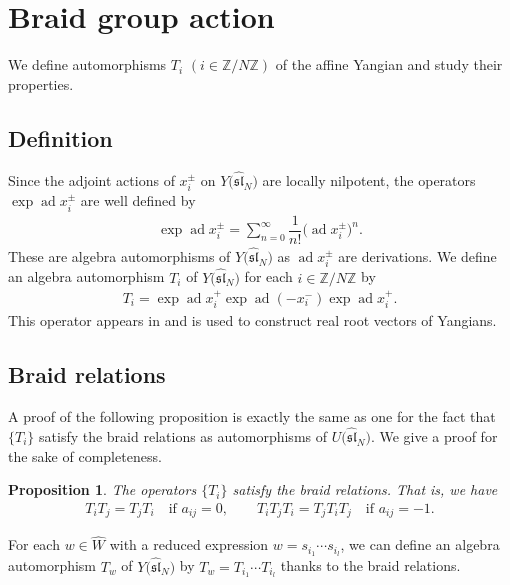 \documentclass[10pt,a4paper]{amsart}
\newtheorem{prop}[thm]{Proposition}
\theoremstyle{definition}
\numberwithin{equation}{section}
\DeclareMathOperator{\ad}{ad}
\newcommand{\bbZ}{\mathbb{Z}}
\newcommand{\affY}{Y\big(\affsl\big)}
\newcommand{\affsl}{\hat{\mathfrak{sl}}_N}
\begin{document}
\section{Braid group action}\label{section3}

We define automorphisms $T_i$ $(i \in \bbZ/N\bbZ)$ of the affine Yangian and study their properties.

\subsection{Definition}

Since the adjoint actions of $x_i^{\pm}$ on $\affY$ are locally nilpotent, the operators $\exp\ad x_i^{\pm}$ are well defined by
\begin{gather*}
\exp\ad x_i^{\pm} = \sum_{n=0}^{\infty} \dfrac{1}{n!} \big(\ad x_i^{\pm}\big)^n.
\end{gather*}
These are algebra automorphisms of $\affY$ as $\ad x_i^{\pm}$ are derivations. We define an algebra automorphism $T_i$ of $\affY$ for each $i \in \bbZ/N\bbZ$ by
\begin{gather*}
T_i = \exp\ad x_i^{+} \exp\ad (-x_i^{-}) \exp\ad x_i^{+}.
\end{gather*}
This operator appears in \cite{MR3861718} and is used to construct real root vectors of Yangians.

\subsection{Braid relations}

A proof of the following proposition is exactly the same as one for the fact that $\{T_i\}$ satisfy the braid relations as automorphisms of $U\big(\affsl\big)$. We give a proof for the sake of completeness.

\begin{prop}\label{prop:braid}The operators $\{T_i\}$ satisfy the braid relations. That is, we have
\begin{gather*}
T_i T_j = T_j T_i \quad \text{if $a_{ij}=0$},\qquad T_i T_j T_i = T_j T_i T_j \quad \text{if $a_{ij}=-1$}.
\end{gather*}
\end{prop}
For each $w \in \hat{W}$ with a reduced expression $w=s_{i_1} \cdots s_{i_l}$, we can define an algebra automorphism $T_w$ of $\affY$ by $T_w = T_{i_1} \cdots T_{i_l}$ thanks to the braid relations.
\end{document}

